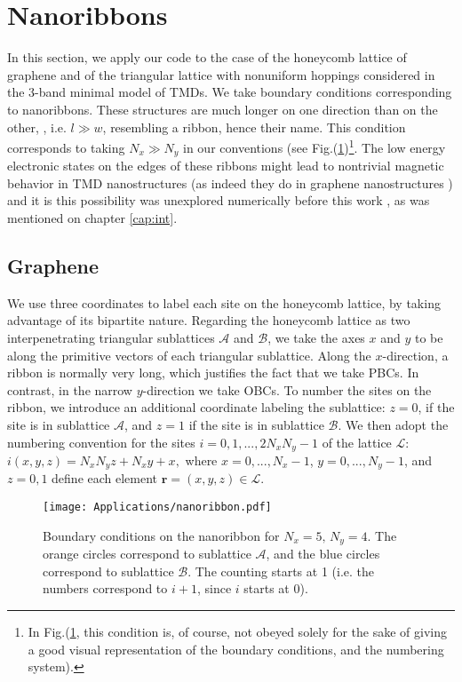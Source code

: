 \section{Nanoribbons}
\label{sec:nanoribbon}

In this section, we apply our code to the case of the honeycomb lattice of graphene and of the triangular lattice with nonuniform hoppings considered in the 3-band minimal model of \acs{TMD}s.
We take boundary conditions corresponding to nanoribbons.
These structures are much longer on one direction than on the other, , i.e. $l \gg w$, resembling a ribbon, hence their name.
This condition corresponds to taking $N_x \gg N_y$ in our conventions (see Fig.(\ref{fig:nanoribbon})\footnote{In Fig.(\ref{fig:nanoribbon}, this condition is, of course, not obeyed solely for the sake of giving a good visual representation of the boundary conditions, and the numbering system).}.
The low energy electronic states on the edges of these ribbons might lead to nontrivial magnetic behavior in \ac{TMD} nanostructures (as indeed they do in graphene nanostructures \cite{yazyev_emergence_2010}) and it is this possibility was unexplored numerically before this work \cite{feldner_dynamical_2011, golor_quantum_2013}, as was mentioned on chapter \ref{cap:int}.

\subsection{Graphene}
\label{sec:graphene}

We use three coordinates to label each site on the honeycomb lattice, by taking advantage of its bipartite nature.
Regarding the honeycomb lattice as two interpenetrating triangular sublattices $\mathcal{A}$ and $\mathcal{B}$, we take the axes $x$ and $y$ to be along the primitive vectors of each triangular sublattice.
Along the $x$-direction, a ribbon is normally very long, which justifies the fact that we take \acp{PBC}.
In contrast, in the narrow $y$-direction we take \acp{OBC}.
To number the sites on the ribbon, we introduce an additional coordinate labeling the sublattice: $z = 0$, if the site is in sublattice $\mathcal{A}$, and $z = 1$ if the site is in sublattice $\mathcal{B}$.
We then adopt the numbering convention for the sites $i = 0,1, ..., 2 N_x N_y - 1$ of the lattice $\mathcal{L}$:
$
i (x, y, z) = N_x N_y z + N_x y + x,
$
 where $x = 0, ..., N_x - 1$, $y = 0, ..., N_y - 1$, and $z = 0, 1$ define each element $\bm r = (x, y, z) \in \mathcal{L}$.

\begin{figure}[H]\label{fig:bcRibbon}
	\centering
\texttt{[image: Applications/nanoribbon.pdf]}
	\caption[Boundary conditions on the nanoribbon.]{Boundary conditions on the nanoribbon for $N_x = 5, \, N_y = 4$. The orange circles correspond to sublattice $\mathcal{A}$, and the blue circles correspond to sublattice $\mathcal{B}$.
	The counting starts at 1 (i.e. the numbers correspond to $i+1$, since $i$ starts at 0).}
	\label{fig:nanoribbon}
\end{figure}

